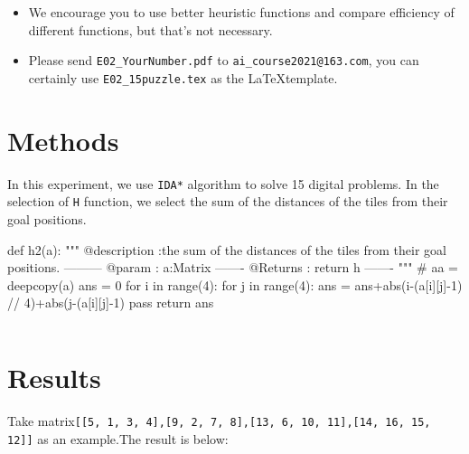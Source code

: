 \documentclass[a4paper, 11pt]{article}
\begin{document}
\begin{itemize}
\begin{figure}[ht]
	\end{figure}
    
    \item We encourage you to use better heuristic functions and compare efficiency of different functions, but that's not necessary.

	\item Please send \texttt{E02\_YourNumber.pdf} to \texttt{ai\_course2021@163.com}, you can certainly use \texttt{E02\_15puzzle.tex} as the \LaTeX template.
\end{itemize}


\section{Methods}
In this experiment, we use \texttt{IDA*} algorithm to solve 15 digital problems. In the selection of \texttt{H} function, we select the sum of the distances of the tiles from their goal positions.
\begin{python}
	def h2(a):
	"""
	@description  :the sum of the distances of the tiles from their goal positions.
	---------
	@param  :
	a:Matrix
	-------
	@Returns  :
	return h
	-------
	"""
	#    aa = deepcopy(a)
	ans = 0
	for i in range(4):
		for j in range(4):
			ans = ans+abs(i-(a[i][j]-1) // 4)+abs(j-(a[i][j]-1) %
	pass
	return ans
\end{python}
\begin{lstlisting}

\end{lstlisting}
\section{Results}
Take matrix\texttt{[[5, 1, 3, 4],[9, 2, 7, 8],[13, 6, 10, 11],[14, 16, 15, 12]]} as an example.The result is below:
\end{document}
